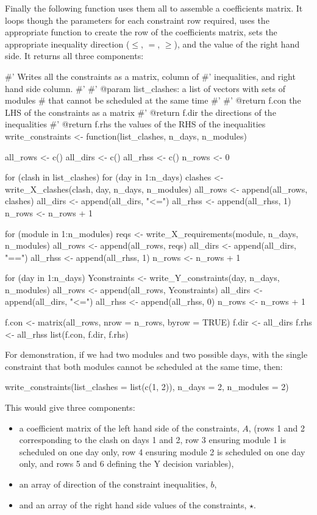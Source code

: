 Finally the following function uses them all to assemble a coefficients matrix.
It loops though the parameters for each constraint row required, uses the
appropriate function to create the row of the coefficients matrix, sets the
appropriate inequality direction ($\leq$, $=$, $\geq$), and the value of the
right hand side.
It returns all three components:

\begin{Rin-no-test}
#' Writes all the constraints as a matrix, column of
#' inequalities, and right hand side column.
#'
#' @param list_clashes: a list of vectors with sets of modules
#         that cannot be scheduled at the same time
#'
#' @return f.con the LHS of the constraints as a matrix
#' @return f.dir the directions of the inequalities
#' @return f.rhs the values of the RHS of the inequalities
write_constraints <- function(list_clashes, n_days, n_modules){
  all_rows <- c()
  all_dirs <- c()
  all_rhss <- c()
  n_rows <- 0
  
  for (clash in list_clashes){
    for (day in 1:n_days){
      clashes <- write_X_clashes(clash, day, n_days, n_modules)
      all_rows <- append(all_rows, clashes)
      all_dirs <- append(all_dirs, "<=")
      all_rhss <- append(all_rhss, 1)
      n_rows <- n_rows + 1
    }
  }
  
  for (module in 1:n_modules){
    reqs <- write_X_requirements(module, n_days, n_modules)
    all_rows <- append(all_rows, reqs)
    all_dirs <- append(all_dirs, "==")
    all_rhss <- append(all_rhss, 1)
    n_rows <- n_rows + 1
  }
  
  for (day in 1:n_days){
    Yconstraints <- write_Y_constraints(day, n_days, n_modules)
    all_rows <- append(all_rows, Yconstraints)
    all_dirs <- append(all_dirs, "<=")
    all_rhss <- append(all_rhss, 0)
    n_rows <- n_rows + 1
  }
  
  f.con <- matrix(all_rows, nrow = n_rows, byrow = TRUE)
  f.dir <- all_dirs
  f.rhs <- all_rhss
  list(f.con, f.dir, f.rhs)
}
\end{Rin-no-test}

For demonstration, if we had two modules and two possible days, with the single
constraint that both modules cannot be scheduled at the same time, then:

\begin{Rin-no-test}
write_constraints(list_clashes = list(c(1, 2)),
                  n_days = 2,
                  n_modules = 2)
\end{Rin-no-test}

This would give three components:
\begin{itemize}
  \item a coefficient matrix of the left hand side of the constraints, $A$, (rows 1
  and 2 corresponding to the clash on days 1 and 2, row 3 ensuring module 1 is
  scheduled on one day only, row 4 ensuring module 2 is scheduled on one day
  only, and rows 5 and 6 defining the Y decision variables),
  \item an array of direction of the constraint inequalities, $b$,
  \item and an array of the right hand side values of the constraints, $\star$.
\end{itemize}

